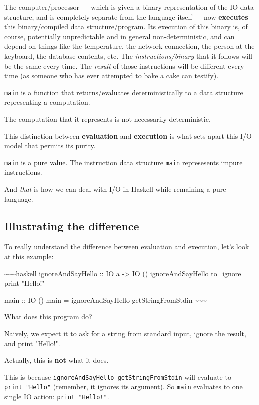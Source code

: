 \documentclass[]{article}
\begin{document}
The computer/processor -\/-\/- which is given a binary representation of the IO
data structure, and is completely separate from the language itself -\/-\/- now
\textbf{executes} this binary/compiled data structure/program. Its execution of
this binary is, of course, potentially unpredictable and in general
non-deterministic, and can depend on things like the temperature, the network
connection, the person at the keyboard, the database contents, etc. The
\emph{instructions/binary} that it follows will be the same every time. The
\emph{result} of those instructions will be different every time (as someone who
has ever attempted to bake a cake can testify).

\texttt{main} is a function that returns/evaluates deterministically to a data
structure representing a computation.

The computation that it represents is not necessarily deterministic.

This distinction between \textbf{evaluation} and \textbf{execution} is what sets
apart this I/O model that permits its purity.

\texttt{main} is a pure value. The instruction data structure \texttt{main}
represesents impure instructions.

And \emph{that} is how we can deal with I/O in Haskell while remaining a pure
language.

\subsection{Illustrating the difference}

To really understand the difference between evaluation and execution, let's look
at this example:

\textasciitilde{}\textasciitilde{}\textasciitilde{}haskell ignoreAndSayHello ::
IO a -\textgreater{} IO () ignoreAndSayHello to\_ignore = print "Hello!"

main :: IO () main = ignoreAndSayHello getStringFromStdin
\textasciitilde{}\textasciitilde{}\textasciitilde{}

What does this program do?

Naively, we expect it to ask for a string from standard input, ignore the
result, and print "Hello!".

Actually, this is \textbf{not} what it does.

This is because \texttt{ignoreAndSayHello\ getStringFromStdin} will evaluate to
\texttt{print\ "Hello"} (remember, it ignores its argument). So \texttt{main}
evaluates to one single IO action: \texttt{print\ "Hello!"}.
\end{document}
